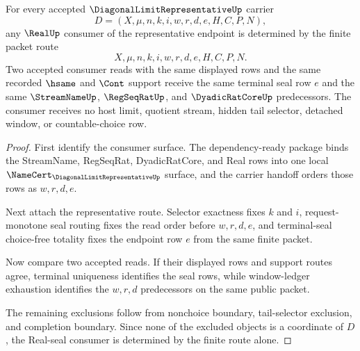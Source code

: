 \begin{theorem}
\label{thm:diagonal-limit-representative-real-seal-consumer-determinacy}
For every accepted $\DiagonalLimitRepresentativeUp$ carrier
$$
D=(X,\mu,n,k,i,w,r,d,e,H,C,P,N),
$$
any $\RealUp$ consumer of the representative endpoint is determined by the finite packet route
$$
X,\mu,n,k,i,w,r,d,e,H,C,P,N.
$$
Two accepted consumer reads with the same displayed rows and the same recorded $\hsame$ and $\Cont$ support receive the same terminal seal row $e$ and the same $\StreamNameUp$, $\RegSeqRatUp$, and $\DyadicRatCoreUp$ predecessors. The consumer receives no host limit, quotient stream, hidden tail selector, detached window, or countable-choice row.
\end{theorem}
\begin{proof}
First identify the consumer surface. The dependency-ready package binds the StreamName, RegSeqRat, DyadicRatCore, and Real rows into one local $\NameCert_{\DiagonalLimitRepresentativeUp}$ surface, and the carrier handoff orders those rows as $w,r,d,e$.

Next attach the representative route. Selector exactness fixes $k$ and $i$, request-monotone seal routing fixes the read order before $w,r,d,e$, and terminal-seal choice-free totality fixes the endpoint row $e$ from the same finite packet.

Now compare two accepted reads. If their displayed rows and support routes agree, terminal uniqueness identifies the seal rows, while window-ledger exhaustion identifies the $w,r,d$ predecessors on the same public packet.

The remaining exclusions follow from nonchoice boundary, tail-selector exclusion, and completion boundary. Since none of the excluded objects is a coordinate of $D$, the Real-seal consumer is determined by the finite route alone.
\end{proof}

